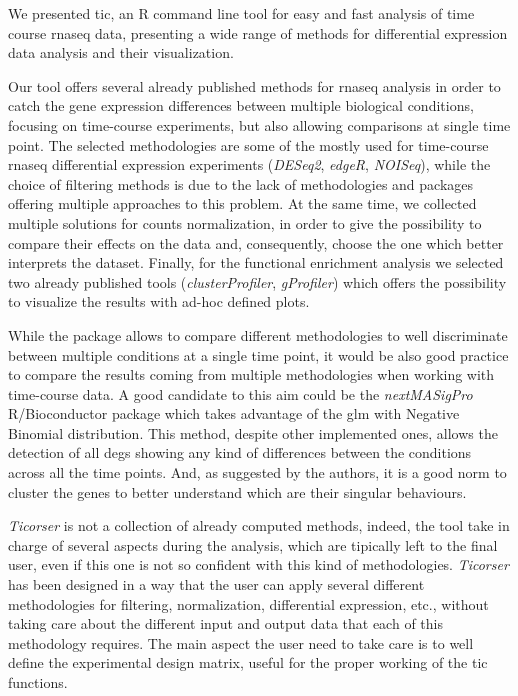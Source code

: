 We presented \gls{tic}, an R command line tool for easy and fast analysis of time course \gls{rnaseq} data, presenting a wide range of methods for differential expression data analysis and their visualization.

Our tool offers several already published methods for \gls{rnaseq} analysis in order to catch the gene expression differences between multiple biological conditions, focusing on time-course experiments, but also allowing comparisons at single time point.
The selected methodologies are some of the mostly used for time-course \gls{rnaseq} differential expression experiments (\textit{DESeq2}, \textit{edgeR}, \textit{NOISeq}), while the choice of filtering methods is due to the lack of methodologies and packages offering multiple approaches to this problem.
At the same time, we collected multiple solutions for counts normalization, in order to give the possibility to compare their effects on the data and, consequently, choose the one which better interprets the dataset.
Finally, for the functional enrichment analysis we selected two already published tools (\textit{clusterProfiler}, \textit{gProfiler}) which offers the possibility to visualize the results with ad-hoc defined plots.

While the package allows to compare different methodologies to well discriminate between multiple conditions at a single time point, it would be also good practice to compare the results coming from multiple methodologies when working with time-course data.
A good candidate to this aim could be the \textit{nextMASigPro} R/Bioconductor package which takes advantage of the \gls{glm} with Negative Binomial distribution.
This method, despite other implemented ones, allows the detection of all \glspl{deg} showing any kind of differences between the conditions across all the time points.
And, as suggested by the authors, it is a good norm to cluster the genes to better understand which are their singular behaviours.

\textit{Ticorser} is not a collection of already computed methods, indeed, the tool take in charge of several aspects during the analysis, which are tipically left to the final user, even if this one is not so confident with this kind of methodologies.
\textit{Ticorser} has been designed in a way that the user can apply several different methodologies for filtering, normalization, differential expression, etc., without taking care about the different input and output data that each of this methodology requires.
The main aspect the user need to take care is to well define the experimental design matrix, useful for the proper working of the \gls{tic} functions.

